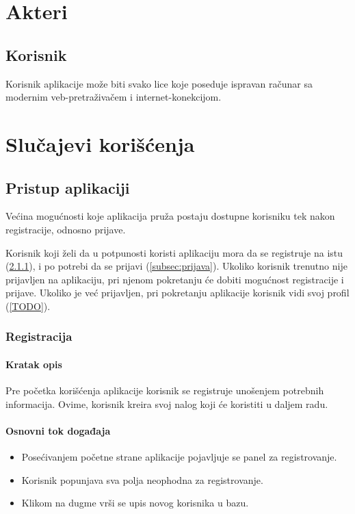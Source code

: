 \chapter{Akteri}
\label{ch:akteri}

\section{Korisnik}
\label{sec:korisnik}
Korisnik aplikacije može biti svako lice koje poseduje ispravan računar sa modernim veb-pretraživačem i internet-konekcijom.



\chapter{Slučajevi korišćenja}
\label{ch:slucajevi-koriscenja}

\section{Pristup aplikaciji}
\label{sec:pristup-aplikaciji}
Većina mogućnosti koje aplikacija pruža postaju dostupne korisniku tek nakon registracije, odnosno prijave.

Korisnik koji želi da u potpunosti koristi aplikaciju mora da se registruje na istu (\ref{subsec:registracija}), i po potrebi da se prijavi (\ref{subsec:prijava}).
Ukoliko korisnik trenutno nije prijavljen na aplikaciju, pri njenom pokretanju će dobiti mogućnost registracije i prijave.
Ukoliko je već prijavljen, pri pokretanju aplikacije korisnik vidi svoj profil (\ref{TODO}).

\subsection{Registracija}
\label{subsec:registracija}

\subsubsection{Kratak opis}
Pre početka korišćenja aplikacije korisnik se registruje unošenjem potrebnih informacija. Ovime, korisnik kreira svoj nalog koji će koristiti u daljem radu.

\subsubsection{Osnovni tok događaja}
\begin{itemize}
  \item Posećivanjem početne strane aplikacije pojavljuje se panel za registrovanje.
  \item Korisnik popunjava sva polja neophodna za registrovanje.
  \item Klikom na dugme  vrši se upis novog korisnika u bazu.
\end{itemize}

